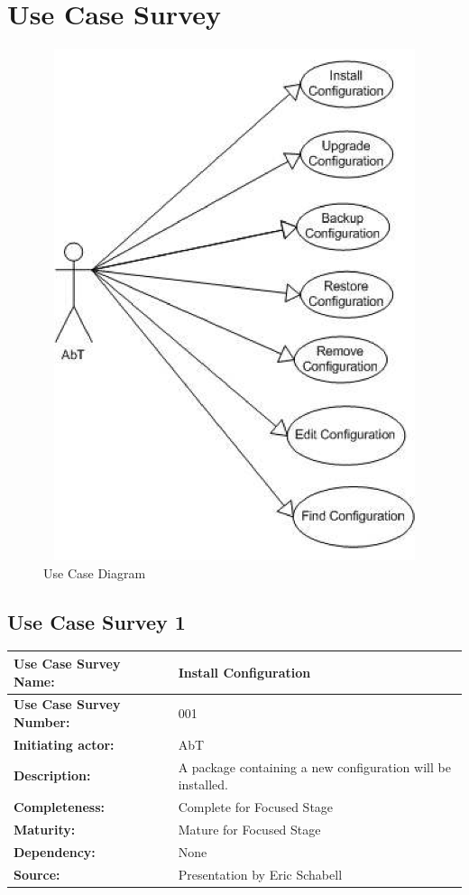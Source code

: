 \newpage

\section{Use Case Survey}

\begin{figure}[htbp]
  \centering
  \includegraphics[angle=0,width=15cm,height=15cm]{"usecasediagram"}
  \caption{Use Case Diagram}
  \label{fig:ucdiagram}
\end{figure}

\subsection{Use Case Survey 1}

\begin{center}
\begin{tabularx}{\linewidth}{|l|p{7.08cm}|}
\hline
\textbf{Use Case Survey Name:} & Install Configuration\\
\hline
\textbf{Use Case Survey Number:} & 001 \\
\hline
\textbf{Initiating actor:} & AbT \\
\hline
\textbf{Description:} & A package containing a new configuration will be installed. \\
\hline
\textbf{Completeness:} & Complete for Focused Stage \\
\hline
\textbf{Maturity:} & Mature for Focused Stage \\
\hline
\textbf{Dependency:} & None \\
\hline
\textbf{Source:} & Presentation by Eric Schabell \\
\hline
\end{tabularx}
\end{center}

